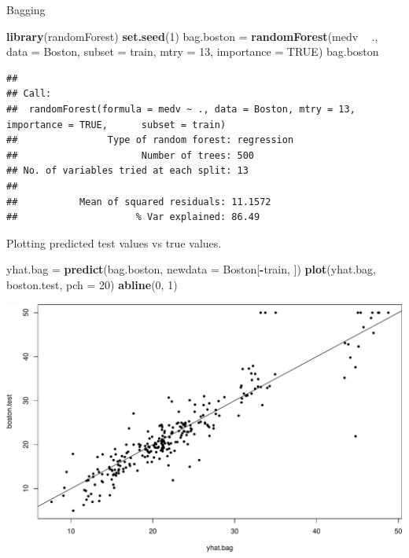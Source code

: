 \documentclass[ignorenonframetext,]{beamer}
\newenvironment{Shaded}{\begin{snugshade}}{\end{snugshade}}
\newcommand{\KeywordTok}[1]{\textcolor[rgb]{0.13,0.29,0.53}{\textbf{#1}}}
\newcommand{\DataTypeTok}[1]{\textcolor[rgb]{0.13,0.29,0.53}{#1}}
\newcommand{\DecValTok}[1]{\textcolor[rgb]{0.00,0.00,0.81}{#1}}
\newcommand{\StringTok}[1]{\textcolor[rgb]{0.31,0.60,0.02}{#1}}
\newcommand{\OtherTok}[1]{\textcolor[rgb]{0.56,0.35,0.01}{#1}}
\newcommand{\OperatorTok}[1]{\textcolor[rgb]{0.81,0.36,0.00}{\textbf{#1}}}
\newcommand{\NormalTok}[1]{#1}
\begin{document}
\begin{frame}[fragile]

\begin{block}{Bagging}

\begin{Shaded}
\begin{Highlighting}[]
\KeywordTok{library}\NormalTok{(randomForest)}
\KeywordTok{set.seed}\NormalTok{(}\DecValTok{1}\NormalTok{)}
\NormalTok{bag.boston =}\StringTok{ }\KeywordTok{randomForest}\NormalTok{(medv }\OperatorTok{~}\StringTok{ }\NormalTok{., }\DataTypeTok{data =}\NormalTok{ Boston, }\DataTypeTok{subset =}\NormalTok{ train, }\DataTypeTok{mtry =} \DecValTok{13}\NormalTok{, }
    \DataTypeTok{importance =} \OtherTok{TRUE}\NormalTok{)}
\NormalTok{bag.boston}
\end{Highlighting}
\end{Shaded}

\begin{verbatim}
## 
## Call:
##  randomForest(formula = medv ~ ., data = Boston, mtry = 13, importance = TRUE,      subset = train) 
##                Type of random forest: regression
##                      Number of trees: 500
## No. of variables tried at each split: 13
## 
##           Mean of squared residuals: 11.1572
##                     % Var explained: 86.49
\end{verbatim}

Plotting predicted test values vs true values.

\begin{Shaded}
\begin{Highlighting}[]
\NormalTok{yhat.bag =}\StringTok{ }\KeywordTok{predict}\NormalTok{(bag.boston, }\DataTypeTok{newdata =}\NormalTok{ Boston[}\OperatorTok{-}\NormalTok{train, ])}
\KeywordTok{plot}\NormalTok{(yhat.bag, boston.test, }\DataTypeTok{pch =} \DecValTok{20}\NormalTok{)}
\KeywordTok{abline}\NormalTok{(}\DecValTok{0}\NormalTok{, }\DecValTok{1}\NormalTok{)}
\end{Highlighting}
\end{Shaded}

\includegraphics{8TreesBEAMER_files/figure-beamer/unnamed-chunk-44-1.pdf}


\end{block}
\end{frame}
\end{document}
